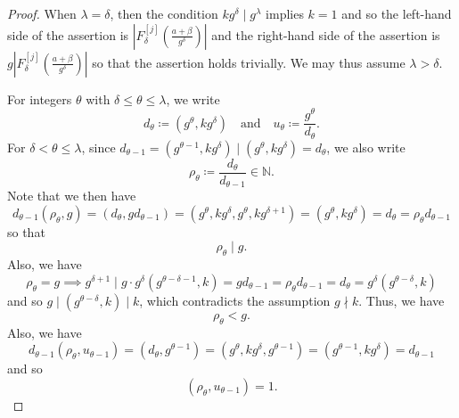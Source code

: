 \documentclass[hidelinks]{amsart}
\numberwithin{equation}{section}
\theoremstyle{plain}
\theoremstyle{definition}
\begin{document}
\begin{proof}
When $\lambda=\delta$, then the condition $kg^{\delta}\mid g^{\lambda}$ implies
$k=1$ and so the left-hand side of the assertion is $|F_{\delta}^{[j]}(\frac{a+\beta}{g^{\delta}})|$
and the right-hand side of the assertion is $g|F_{\delta}^{[j]}(\frac{a+\beta}{g^{\delta}})|$
so that the assertion holds trivially.
We may thus assume $\lambda>\delta$.

For integers $\theta$ with $\delta\le\theta\le\lambda$, we write
\begin{equation}
\label{lem:F_L1_moment:def:d_u}
d_{\theta}\coloneqq(g^{\theta},kg^{\delta})
\quad\text{and}\quad
u_{\theta}\coloneqq\frac{g^{\theta}}{d_{\theta}}.
\end{equation}
For $\delta<\theta\le\lambda$, since
$d_{\theta-1}=(g^{\theta-1},kg^{\delta})\mid(g^{\theta},kg^{\delta})=d_{\theta}$,
we also write
\begin{equation}
\label{lem:F_L1_moment:def:rho}
\rho_{\theta}
\coloneqq
\frac{d_{\theta}}{d_{\theta-1}}\in\mathbb{N}.
\end{equation}
Note that we then have
\[
d_{\theta-1}(\rho_{\theta},g)
=
(d_{\theta},gd_{\theta-1})
=
(g^{\theta},kg^{\delta},g^{\theta},kg^{\delta+1})
=
(g^{\theta},kg^{\delta})
=
d_{\theta}
=
\rho_{\theta}d_{\theta-1}
\]
so that
\begin{equation}
\label{lem:F_L1_moment:rho_div_g}
\rho_{\theta}\mid g.
\end{equation}
Also, we have
\[
\rho_{\theta}=g
\implies
g^{\delta+1}
\mid
g\cdot g^{\delta}(g^{\theta-\delta-1},k)
=
gd_{\theta-1}
=
\rho_{\theta}d_{\theta-1}
=
d_{\theta}
=
g^{\delta}(g^{\theta-\delta},k)
\]
and so $g\mid (g^{\theta-\delta},k)\mid k$,
which contradicts the assumption $g\nmid k$. Thus, we have
\begin{equation}
\label{lem:F_L1_moment:rho_less_g}
\rho_{\theta}<g.
\end{equation}
Also, we have
\[
d_{\theta-1}(\rho_{\theta},u_{\theta-1})
=
(d_{\theta},g^{\theta-1})
=
(g^{\theta},kg^{\delta},g^{\theta-1})
=
(g^{\theta-1},kg^{\delta})
=
d_{\theta-1}
\]
and so
\begin{equation}
\label{lem:F_L1_moment:rho_u_coprime}
(\rho_{\theta},u_{\theta-1})=1.
\end{equation}


\end{proof}
\end{document}

